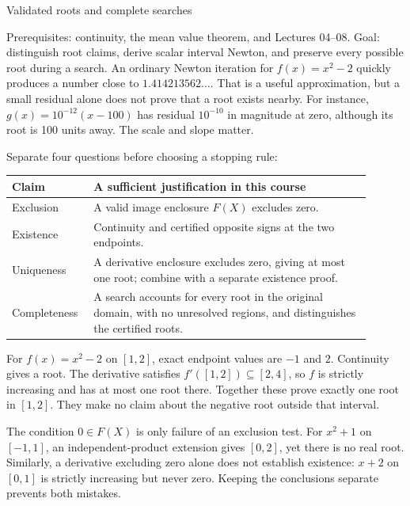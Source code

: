 \def\lecturenumber{09}


\opening{Validated roots and complete searches}{Prerequisites: continuity, the mean value theorem, and Lectures 04--08.\newline
Goal: distinguish root claims, derive scalar interval Newton, and preserve every possible root during a search.}
An ordinary Newton iteration for $f(x)=x^2-2$ quickly produces a number
close to $1.414213562\ldots$. That is a useful approximation, but a small
residual alone does not prove that a root exists nearby. For instance,
$g(x)=10^{-12}(x-100)$ has residual $10^{-10}$ in magnitude at zero,
although its root is 100 units away. The scale and slope matter.

Separate four questions before choosing a stopping rule:
\begin{center}
\begin{tabular}{p{0.18\linewidth}p{0.72\linewidth}}
\toprule
Claim & A sufficient justification in this course\\
\midrule
Exclusion & A valid image enclosure $F(X)$ excludes zero.\\[4pt]
Existence & Continuity and certified opposite signs at the two endpoints.\\[4pt]
Uniqueness & A derivative enclosure excludes zero, giving at most one root;
combine with a separate existence proof.\\[4pt]
Completeness & A search accounts for every root in the original domain,
with no unresolved regions, and distinguishes the certified roots.\\
\bottomrule
\end{tabular}
\end{center}

For $f(x)=x^2-2$ on $[1,2]$, exact endpoint values are $-1$ and $2$.
Continuity gives a root. The derivative satisfies $f'([1,2])\subseteq[2,4]$,
so $f$ is strictly increasing and has at most one root there. Together these
prove exactly one root in $[1,2]$. They make no claim about the negative
root outside that interval.

The condition $0\in F(X)$ is only failure of an exclusion test. For
$x^2+1$ on $[-1,1]$, an independent-product extension gives $[0,2]$,
yet there is no real root. Similarly, a derivative excluding zero alone
does not establish existence: $x+2$ on $[0,1]$ is strictly increasing
but never zero. Keeping the conclusions separate prevents both mistakes.

